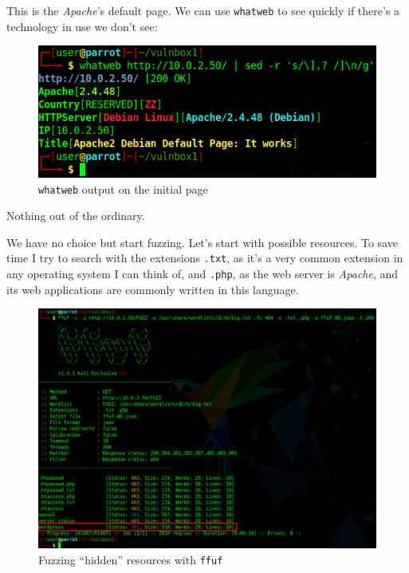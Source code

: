 \documentclass[12pt]{article}
\begin{document}
    This is the \textit{Apache}'s default page. We can use \texttt{whatweb} to
    see quickly if there's a technology in use we don't see:

    \begin{figure}[H]\label{pic:05-whatweb}
        \centering
        \includegraphics[width=1.00\textwidth]{05-whatweb-80.png}
        \caption{\texttt{whatweb} output on the initial page}
    \end{figure}

    Nothing out of the ordinary.

    We have no choice but start fuzzing. Let's start with possible resources. To
    save time I try to search with the extensions \texttt{.txt}, as it's a very
    common extension in any operating system I can think of, and \texttt{.php}, 
    as the web server is \textit{Apache}, and its web applications are commonly
    written in this language.

    \begin{figure}[H]\label{pic:06-ffuf}
        \centering
        \includegraphics[width=1.00\textwidth]{06-ffuf-80-gimp.png}
        \caption{Fuzzing ``hidden'' resources with \texttt{ffuf}}
    \end{figure}
\end{document}

